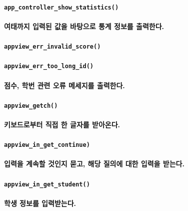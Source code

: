 \documentclass[UTF8]{report}
\begin{document}
            \paragraph{\texttt{app\_controller\_show\_statistics()}}
            \paragraph{%
                \normalfont 여태까지 입력된 값을 바탕으로 통계 정보를 출력한다.
            }

            \paragraph{\texttt{appview\_err\_invalid\_score()}}
            \paragraph{\texttt{appview\_err\_too\_long\_id()}}
            \paragraph{%
                \normalfont 점수, 학번 관련 오류 메세지를 출력한다.
            }

            \paragraph{\texttt{appview\_getch()}}
            \paragraph{%
                \normalfont 키보드로부터 직접 한 글자를 받아온다.
            }

            \paragraph{\texttt{appview\_in\_get\_continue)}}
            \paragraph{%
                \normalfont 입력을 계속할 것인지 묻고, 해당 질의에 대한 입력을 받는다.
            }

            \paragraph{\texttt{appview\_in\_get\_student()}}
            \paragraph{%
                \normalfont 학생 정보를 입력받는다.
            }
\end{document}
